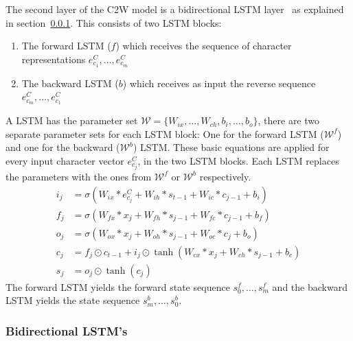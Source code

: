 The second layer of the C2W model is a bidirectional LSTM layer~\cite{DBLP:journals/nn/GravesS05} as explained in section~\ref{subsec:bidir-rnn}. 
This consists of two LSTM blocks:
\begin{enumerate}
  \item The forward LSTM ($f$) which receives the sequence of character representations $e_{c_1}^C, \dots, e_{c_m}^C$
  \item The backward LSTM ($b$) which receives as input the reverse sequence $e_{c_m}^C, \dots, e_{c_1}^C$
\end{enumerate}
A LSTM has the parameter set $\mathcal{W} = \{W_{ix},\dots,W_{ch},b_i,\dots,b_o\}$,
there are two separate parameter sets for each LSTM block: One for the forward LSTM ($\mathcal{W}^f$) and one for the backward ($\mathcal{W}^b$) LSTM.
These basic equations are applied for every input character vector $e_{c_j}^C$, in the two LSTM blocks. 
Each LSTM replaces the parameters with the ones from $\mathcal{W}^f$ or $\mathcal{W}^b$ respectively.
\begin{equation}
\begin{aligned}  
  i_j &=\sigma(W_{ix} * e_{c_j}^C  + W_{ih} * s_{t-1} + W_{ic} * c_{j-1} + b_i) \\  
  f_j &=\sigma(W_{fx} * x_j  + W_{fh} * s_{j-1} + W_{fc} * c_{j-1} + b_f) \\
  o_j &=\sigma(W_{ox} * x_j  + W_{oh} * s_{j-1} + W_{oc} * c_j + b_o) \\  
  c_j &= f_j \odot c_{t-1} + i_j \odot \tanh(W_{cx} * x_j  + W_{ch} * s_{j-1} + b_c) \\ 
  s_j &= o_j \odot \tanh(c_j) 
\end{aligned}
\end{equation}
The forward LSTM yields the forward state sequence $s_{0}^f, \dots, s_{m}^f$ and the backward LSTM yields the state sequence $s_{m}^b, \dots, s_{0}^b$.

\subsubsection{Bidirectional LSTM's}
\label{subsec:bidir-rnn}

